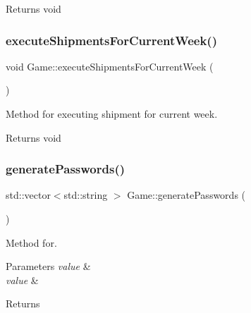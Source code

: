 \begin{DoxyReturn}{Returns}
void 
\end{DoxyReturn}
\mbox{\label{classGame_ab3dc5ad2b07ebdab4ed710904bb629e8}} 
\subsubsection{\texorpdfstring{execute\+Shipments\+For\+Current\+Week()}{executeShipmentsForCurrentWeek()}}
{\footnotesize\ttfamily void Game\+::execute\+Shipments\+For\+Current\+Week (\begin{DoxyParamCaption}{ }\end{DoxyParamCaption})}



Method for executing shipment for current week. 

\begin{DoxyReturn}{Returns}
void 
\end{DoxyReturn}
\mbox{\label{classGame_abb451d6df42d5c439e4f3e16627732fd}} 
\subsubsection{\texorpdfstring{generate\+Passwords()}{generatePasswords()}}
{\footnotesize\ttfamily std\+::vector$<$std\+::string $>$ Game\+::generate\+Passwords (\begin{DoxyParamCaption}{ }\end{DoxyParamCaption})}



Method for. 


\begin{DoxyParams}{Parameters}
{\em value} & \\
\hline
{\em value} & \\
\hline
\end{DoxyParams}
\begin{DoxyReturn}{Returns}

\end{DoxyReturn}
\mbox{\label{classGame_ac00135b6b5128aca74b09e9f79d54b60}} 
